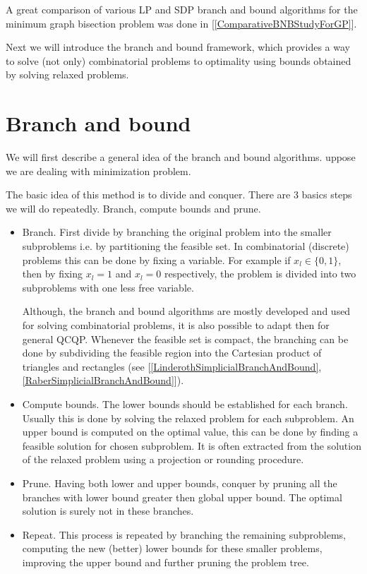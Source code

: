 \documentclass[12pt]{book}
\theoremstyle{definition}
\begin{document}
A great comparison of various LP and SDP branch and bound algorithms for the minimum graph bisection problem was done in [\ref{ComparativeBNBStudyForGP}].




Next we will introduce the branch and bound framework, which provides a way to solve (not only) combinatorial problems to optimality using bounds obtained by solving relaxed problems.

\section{Branch and bound}
\label{SectionBranchAndBound}



We will first describe a general idea of the branch and bound algorithms.  uppose we are dealing with minimization problem.

The basic idea of this method is to divide and conquer. There are 3 basics steps we will do repeatedly. Branch, compute bounds and prune.
\begin{itemize}
\item Branch. First divide by branching the original problem into the smaller subproblems i.e. by partitioning the feasible set. 
 In combinatorial (discrete) problems this can be done by fixing a variable. For example if $x_l \in \{0,1\}$, then by fixing $x_l=1$ and $x_l=0$ respectively, the problem is divided into two subproblems with one less free variable. 

Although, the branch and bound algorithms are mostly developed and used for solving combinatorial problems, it is also possible to adapt then for general QCQP. Whenever the feasible set is compact, the branching can be done by subdividing the feasible region into the Cartesian product of triangles and rectangles (see [\ref{LinderothSimplicialBranchAndBound}, \ref{RaberSimplicialBranchAndBound}]). 


\item Compute bounds. The lower bounds should be established for each branch. Usually this is done by solving the relaxed problem for each subproblem. 
An upper bound is computed on the optimal value, this can be done by finding a feasible solution for chosen subproblem. It is often extracted from the solution of the relaxed problem using a projection or rounding procedure.

\item Prune. Having both lower and upper bounds, conquer by pruning all the branches with lower bound greater then global upper bound. The optimal solution is surely not in these branches.

\item Repeat. This process is repeated by branching the remaining subproblems, computing the new (better) lower bounds for these smaller problems, improving the upper bound and further pruning the problem tree.
\end{itemize}
\end{document}
